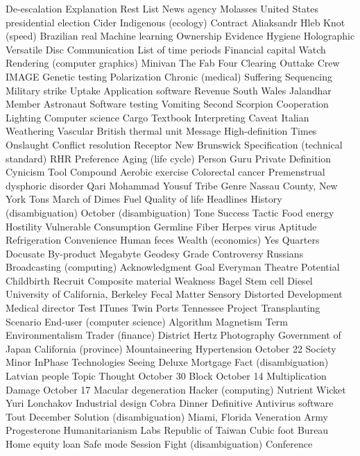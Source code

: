 De-escalation  Explanation  Rest  
List  News agency  Molasses  
United States presidential election  Cider  Indigenous (ecology)  
Contract  Aliaksandr Hleb  Knot (speed)  
Brazilian real  Machine learning  Ownership  
Evidence  Hygiene  Holographic Versatile Disc  
Communication  List of time periods  Financial capital  
Watch  Rendering (computer graphics)  Minivan  
The Fab Four  Clearing  Outtake  
Crew  IMAGE  Genetic testing  
Polarization  Chronic (medical)  Suffering  
Sequencing  Military strike  Uptake  
Application software  Revenue  South Wales  
Jalandhar  Member  Astronaut  
Software testing  Vomiting  Second  
Scorpion  Cooperation  Lighting  
Computer science  Cargo  Textbook  
Interpreting  Caveat  Italian  
Weathering  Vascular  British thermal unit  
Message  High-definition  Times  
Onslaught  Conflict resolution  Receptor  
New Brunswick  Specification (technical standard)  RHR  
Preference  Aging (life cycle)  Person  
Guru  Private  Definition  
Cynicism  Tool  Compound  
Aerobic exercise  Colorectal cancer  Premenstrual dysphoric disorder  
Qari Mohammad Yousuf  Tribe  Genre  
Nassau County, New York  Tons  March of Dimes  
Fuel  Quality of life  Headlines  
History (disambiguation)  October (disambiguation)  Tone  
Success  Tactic  Food energy  
Hostility  Vulnerable  Consumption  
Germline  Fiber  Herpes virus  
Aptitude  Refrigeration  Convenience  
Human feces  Wealth (economics)  Yes  
Quarters  Docusate  By-product  
Megabyte  Geodesy  Grade  
Controversy  Russians  Broadcasting (computing)  
Acknowledgment  Goal  Everyman Theatre  
Potential  Childbirth  Recruit  
Composite material  Weakness  Bagel  
Stem cell  Diesel  University of California, Berkeley  
Fecal Matter  Sensory  Distorted  
Development  Medical director  Test  
ITunes  Twin Ports  Tennessee  
Project  Transplanting  Scenario  
End-user (computer science)  Algorithm  Magnetism  
Term  Environmentalism  Trader (finance)  
District  Hertz  Photography  
Government of Japan  California (province)  Mountaineering  
Hypertension  October 22  Society  
Minor  InPhase Technologies  Seeing  
Deluxe  Mortgage  Fact (disambiguation)  
Latvian people  Topic  Thought  
October 30  Block  October 14  
Multiplication  Damage  October 17  
Macular degeneration  Hacker (computing)  Nutrient  
Wicket  Yuri Lonchakov  Industrial design  
Cobra  Dinner  Definitive  
Antivirus software  Tout  December  
Solution (disambiguation)  Miami, Florida  Veneration  
Army  Progesterone  Humanitarianism  
Labs  Republic of Taiwan  Cubic foot  
Bureau  Home equity loan  Safe mode  
Session  Fight (disambiguation)  Conference  
